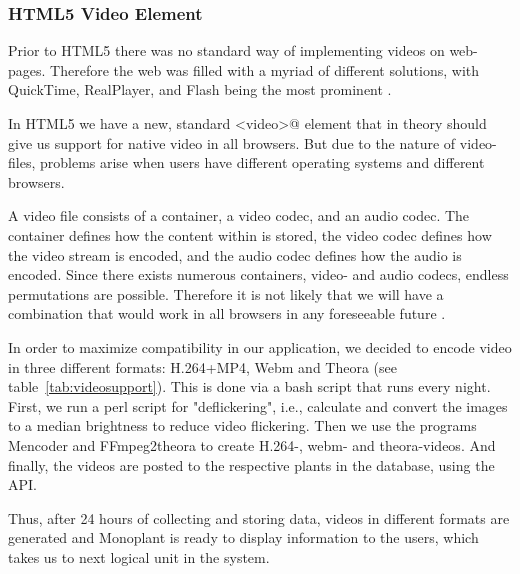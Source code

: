 
\subsubsection{HTML5 Video Element}
Prior to HTML5 there was no standard way of implementing videos on web-pages. Therefore the web was filled with a myriad of different solutions, with QuickTime, RealPlayer, and Flash being the most prominent \citep{pilgrim2010html5}.

In HTML5 we have a new, standard \verb@<video>@ element that in theory should give us support for native video in all browsers. But due to the nature of video-files, problems arise when users have different operating systems and different browsers. 

A video file consists of a container, a video codec, and an audio codec. The container defines how the content within is stored, the video codec defines how the video stream is encoded, and the audio codec defines how the audio is encoded. Since there exists numerous containers, video- and audio codecs, endless permutations are possible. Therefore it is not likely that we will have a combination that would work in all browsers in any foreseeable future \citep{pilgrim2010html5}.

In order to maximize compatibility in our application, we decided to encode video in three different formats: H.264+MP4, Webm and Theora (see table~\ref{tab:videosupport}). This is done via a bash script that runs every night. First, we run a perl script for "deflickering", i.e., calculate and convert the images to a median brightness to reduce video flickering. Then we use the programs Mencoder and FFmpeg2theora to create H.264-, webm- and theora-videos. And finally, the videos are posted to the respective plants in the database, using the API. 

Thus, after 24 hours of collecting and storing data, videos in different formats are generated and Monoplant is ready to display information to the users, which takes us to next logical unit in the system.

